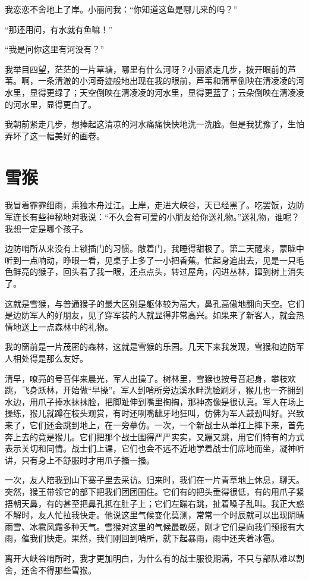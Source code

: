 \documentclass[12pt,UTF-8,openany]{ctexbook}
\begin{document}
\begin{Large}
    我恋恋不舍地上了岸。小丽问我：“你知道这鱼是哪儿来的吗？”
    
    “那还用问，有水就有鱼嘛！”
    
    “我是问你这里有河没有？”
    
    我举目四望，茫茫的一片草塘，哪里有什么河呀？小丽紧走几步，拨开眼前的芦苇。啊，一条清澈的小河奇迹般地出现在我的眼前，芦苇和蒲草倒映在清凌凌的河水里，显得更绿了；天空倒映在清凌凌的河水里，显得更蓝了；云朵倒映在清凌凌的河水里，显得更白了。
    
    我朝前紧走几步，想捧起这清凉的河水痛痛快快地洗一洗脸。但是我犹豫了，生怕弄坏了这一幅美好的画卷。
    
\end{Large}

\chapter{雪猴}

\begin{Large}
    
    我冒着霏霏细雨，乘独木舟过江。上岸，走进大峡谷，天已经黑了。吃罢饭，边防军连长有些神秘地对我说：“不久会有可爱的小朋友给你送礼物。”送礼物，谁呢？我想一定是哪个孩子。
    
    边防哨所从来没有上锁插门的习惯。敞着门，我睡得甜极了。第二天醒来，蒙眬中听到一点响动，睁眼一看，见桌子上多了一小把香蕉。忙起身追出去，见是一只毛色鲜亮的猴子，回头看了我一眼，还点点头，转过屋角，闪进丛林，蹿到树上消失了。
    
    这就是雪猴，与普通猴子的最大区别是躯体较为高大，鼻孔高傲地翻向天空。它们是边防军人的好朋友，见了穿军装的人就显得非常高兴。如果来了新客人，就会热情地送上一点森林中的礼物。
    
    我的窗前是一片茂密的森林，这就是雪猴的乐园。几天下来我发现，雪猴和边防军人相处得是那么友好。
    
    清早，嘹亮的号音伴来晨光，军人出操了。树林里，雪猴也按号音起身，攀枝欢跳，飞身跃林，开始做“早操”。军人到哨所旁边溪水畔洗脸刷牙，猴儿也一齐拥到水边，用爪子捧水抹抹脸，把脚趾伸到嘴里掏掏，那神态像是很认真。军人在场上操练，猴儿就蹲在枝头观赏，有时还咧嘴龇牙地狂叫，仿佛为军人鼓劲叫好。兴致来了，它们还会跳到地上，在一旁摹仿。一次，一个新战士从单杠上摔下来，首先奔上去的竟是猴儿。它们把那个战士围得严严实实，又蹦又跳，用它们特有的方式表示关切和同情。战士们上课，它们也会不远不近地学着战士们席地而坐，凝神听讲，只有身上不舒服时才用爪子搔一搔。
    
    一次，友人陪我到山下寨子里去采访。归来时，我们在一片青草地上休息，聊天。突然，猴王带领它的部下把我们团团围住。它们有的把头垂得很低，有的用爪子紧捂朝天鼻，有的甚至把鼻孔抵在肚子上；它们左蹦右跳，扯着嗓子乱叫。我正大惑不解时，友人忙拉我快走。他说这里气候变化莫测，常常一个时辰就可以出现阴晴雨雪、冰雹风霜多种天气。雪猴对这里的气候最敏感，刚才它们是向我们预报有大雨，催我们快走。果然，我们刚回到哨所，就下起暴雨，雨中还夹着冰雹。
    
    离开大峡谷哨所时，我才更加明白，为什么有的战士服役期满，不只与部队难以割舍，还舍不得那些雪猴。
    
\end{Large}
\end{document}
